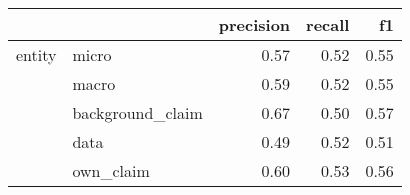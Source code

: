 \begin{tabular}{llrrr}
\toprule
       &           &  precision &  recall &   f1 \\
\midrule
entity & micro &       0.57 &    0.52 & 0.55 \\
       & macro &       0.59 &    0.52 & 0.55 \\
       & background\_claim &       0.67 &    0.50 & 0.57 \\
       & data &       0.49 &    0.52 & 0.51 \\
       & own\_claim &       0.60 &    0.53 & 0.56 \\
\bottomrule
\end{tabular}
